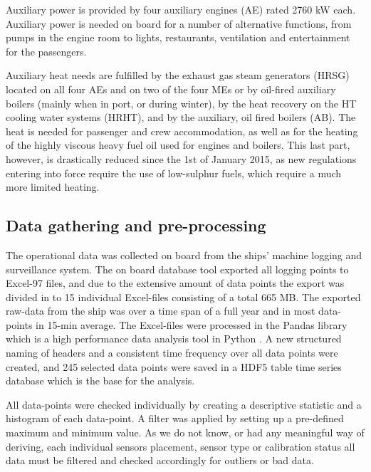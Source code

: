 \documentclass[preprint,12pt]{elsarticle}
\begin{document}
Auxiliary power is provided by four auxiliary engines (AE) rated 2760 kW each. Auxiliary power is needed on board for a number of alternative functions, from pumps in the engine room to lights, restaurants, ventilation and entertainment for the passengers. 

Auxiliary heat needs are fulfilled by the exhaust gas steam generators (HRSG) located on all four AEs and on two of the four MEs or by oil-fired auxiliary boilers (mainly when in port, or during winter), by the heat recovery on the HT cooling water systems (HRHT), and by the auxiliary, oil fired boilers (AB). The heat is needed for passenger and crew accommodation, as well as for the heating of the highly viscous heavy fuel oil used for engines and boilers. This last part, however, is drastically reduced since the 1st of January 2015, as new regulations entering into force require the use of low-sulphur fuels, which require a much more limited heating.

\subsection{Data gathering and pre-processing} \label{sec:met:gathering}

The operational data was collected on board from the ships' machine logging and surveillance system. The on board database tool exported all logging points to Excel-97 files, and due to the extensive amount of data points the export was divided in to 15 individual Excel-files consisting of a total 665 MB. The exported raw-data from the ship was over a time span of a full year and in most data-points in 15-min average. The Excel-files were processed in the Pandas library which is a high performance data analysis tool in Python \cite{mckinney-proc-scipy-2010}. A new structured naming of headers and a consistent time frequency over all data points were created, and 245 selected data points were saved in a HDF5 table time series database which is the base for the analysis.

All data-points were checked individually by creating a descriptive statistic and a histogram of each data-point. A filter was applied by setting up a pre-defined maximum and minimum value. As we do not know, or had any meaningful way of deriving, each individual sensors placement, sensor type or calibration status all data must be filtered and checked accordingly for outliers or bad data. 
\end{document}
